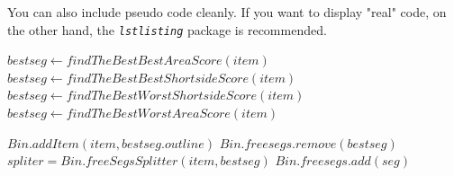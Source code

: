 \blindtext[3]

\begin{algorithm}[tb]
	\caption{You can also include pseudo code cleanly. If you want to display "real" code, on the other hand, the \emph{\texttt{lstlisting}} package is recommended.}
	\label{alg:guillotine}
	\begin{algorithmic}[1]
		\State $bestseg \gets findTheBestBestAreaScore(item)$
		\State $bestseg \gets findTheBestBestShortsideScore(item)$
		\State $bestseg \gets findTheBestWorstShortsideScore(item)$
		\Else
		\State $bestseg \gets findTheBestWorstAreaScore(item)$
		\EndIf
		
		\State $Bin.addItem(item, bestseg.outline)$
		\State $Bin.freesegs.remove(bestseg)$
		\State $spliter = Bin.freeSegsSplitter(item, bestseg)$
		\State $Bin.freesegs.add(seg)$
		\EndFor
		\EndIf				
		\EndProcedure		
	\end{algorithmic}
\end{algorithm}

\blindtext[3]

\blindtext[2]
%





\cleardoubleemptypage